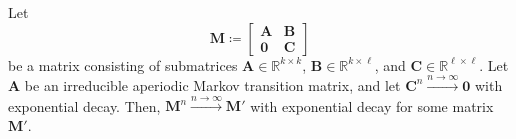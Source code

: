 \documentclass[../../main.tex]{subfiles}
\begin{document}
    \begin{lemma}
        \label{lemma:exponential_convergence_with_open_states}
        Let
        \[
            \bm{M} \coloneqq
            \begin{bmatrix}
                \bm{A} & \bm{B} \\
                \bm{0} & \bm{C}
            \end{bmatrix}
        \]
        be a matrix consisting of submatrices \( \bm{A} \in \mathbb{R}^{k \times k} \), \( \bm{B} \in \mathbb{R}^{k \times \ell} \), and \( \bm{C} \in \mathbb{R}^{\ell \times \ell} \). Let $\bm{A}$ be an irreducible aperiodic Markov transition matrix, and let $\bm{C}^n \xrightarrow{n \to \infty} \bm{0}$ with exponential decay.
        Then, $\bm{M}^n \xrightarrow{n \to \infty} \bm{M}'$ with exponential decay for some matrix $\bm{M}'$.
    \end{lemma}
    \vspace{-2.5em}
\end{document}
